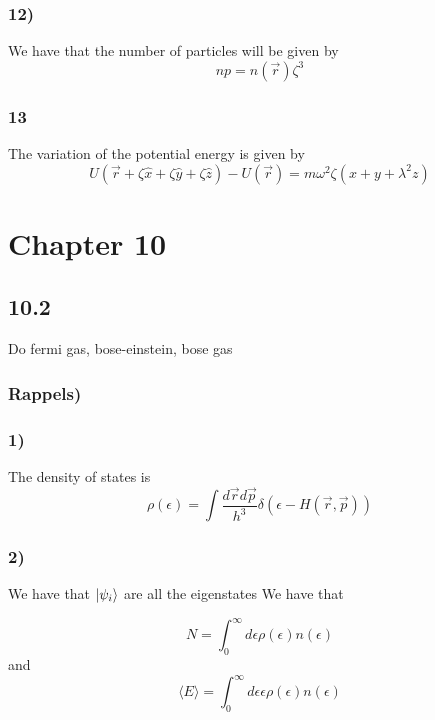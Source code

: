 \documentclass[10pt,a4paper]{book}
\begin{document}
\subsection*{12)}
We have that the number of particles will be given by 
$$np=n(\vec{r})\zeta^3$$

\subsection*{13}
The variation of the potential energy is given by 
$$U(\vec{r}+\zeta\hat{x}+\zeta\hat{y}+\zeta\hat{z})-U(\vec{r})=m\omega^2\zeta(x+y+\lambda^2z)$$




\chapter*{Chapter 10}
\section*{10.2}
Do fermi gas, bose-einstein, bose gas

\subsection*{Rappels)}



\subsection*{1)}
The density of states is 
$$\rho(\epsilon)=\int\frac{d\vec{r}d\vec{p}}{h^3}\delta(\epsilon-H(\vec{r},\vec{p}))$$

\subsection*{2)}
We have that $\ket{\psi_i}$ are all the eigenstates
We have that 

$$N=\int_{0}^{\infty}d\epsilon \rho(\epsilon)n(\epsilon)$$
and 
$$
\langle E\rangle=\int_{0}^{\infty} d\epsilon\epsilon\rho(\epsilon)n(\epsilon)$$
\end{document}
